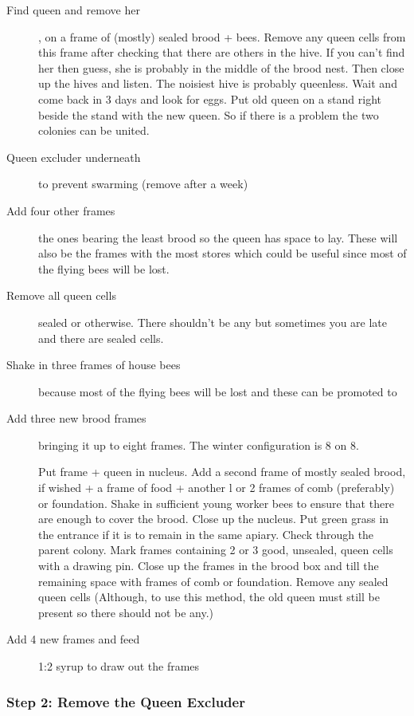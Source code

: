 \begin{description}
  \item[Find queen and remove her], on a frame of (mostly) sealed brood + bees. Remove any queen cells from this frame after checking that there are others in the hive.
  If you can't find her  then guess, she is probably in the middle of the brood nest.
  Then close up the hives and listen.  The noisiest hive is probably queenless.
  Wait and come back in 3 days and look for eggs.
  Put old queen on a stand right beside the stand with the new queen.
  So if there is a problem the two colonies can be united.
  \item[Queen excluder underneath] to prevent swarming (remove after a week)
  \item[Add four other frames] the ones bearing the least brood so the queen has space to lay.
  These will also be the frames with the most stores which could be useful since most of the flying bees will be lost.
  \item[Remove all queen cells] sealed or otherwise.  There shouldn't be any but sometimes you are late and there are sealed cells.
  \item[Shake in three frames of house bees] because most of the flying bees will be lost and these can be promoted to 
  \item[Add three new brood frames] bringing it up to eight frames.  The winter configuration is 8 on 8.
  
  
Put frame + queen in nucleus.
Add a second frame of mostly sealed brood, if wished + a frame of food + another l or 2
frames of comb (preferably) or foundation.
Shake in sufficient young worker bees to ensure that there are enough to cover the brood.
Close up the nucleus. Put green grass in the entrance if it is to remain in the same apiary.
Check through the parent colony.  Mark frames containing 2 or 3 good, unsealed, queen cells with a drawing pin.
Close up the frames in the brood box and till the remaining space with frames of comb or foundation.
  Remove any sealed queen cells (Although, to use this method, the old queen must still be present so there should not be any.)
  \item[Add 4 new frames and feed] 1:2 syrup to draw out the frames
\end{description}

\subsubsection*{Step 2: Remove the Queen Excluder}

